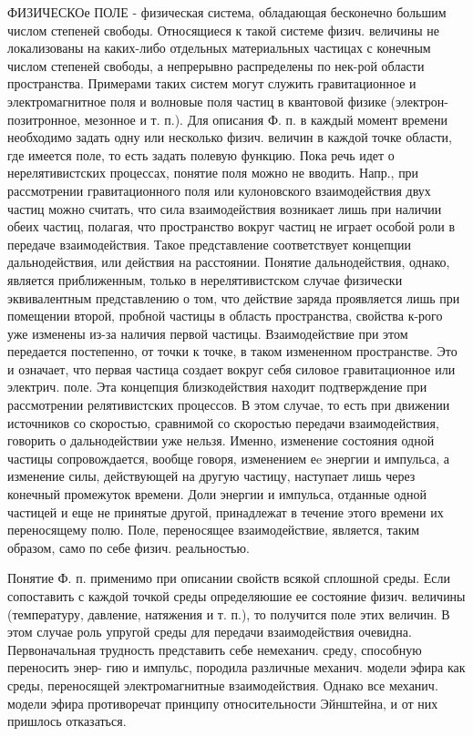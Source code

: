 \documentclass[10pt]{article}
\begin{document}
ФИЗИЧЕСКОе ПОЛЕ - физическая система, обладающая бесконечно большим числом степеней свободы. Относящиеся к такой системе физич. величины не локализованы на каких-либо отдельных материальных частицах с конечным числом степеней свободы, а непрерывно распределены по нек-рой области пространства. Примерами таких систем могут служить гравитационное и электромагнитное поля и волновые поля частиц в квантовой физике (электрон-позитронное, мезонное и т. п.). Для описания Ф. п. в каждый момент времени необходимо задать одну или несколько физич. величин в каждой точке области, где имеется поле, то есть задать полевую функцию. Пока речь идет о нерелятивистских процессах, понятие поля можно не вводить. Напр., при рассмотрении гравитационного поля или кулоновского взаимодействия двух частиц можно считать, что сила взаимодействия возникает лишь при наличии обеих частиц, полагая, что пространство вокруг частиц не играет особой роли в передаче взаимодействия. Такое представление соответствует концепции дальнодействия, или действия на расстоянии. Понятие дальнодействия, однако, является приближенным, только в нерелятивистском случае физически эквивалентным представлению о том, что действие заряда проявляется лишь при помещении второй, пробной частицы в область пространства, свойства к-рого уже изменены из-за наличия первой частицы. Взаимодействие при этом передается постепенно, от точки к точке, в таком измененном пространстве. Это и означает, что первая частица создает вокруг себя силовое гравитационное или электрич. поле. Эта концепция близкодействия находит подтверждение при рассмотрении релятивистских процессов. В этом случае, то есть при движении источников со скоростью, сравнимой со скоростью передачи взаимодействия, говорить о дальнодействии уже нельзя. Именно, изменение состояния одной частицы сопровождается, вообще говоря, изменением еe энергии и импульса, а изменение силы, действующей на другую частицу, наступает лишь через конечный промежуток времени. Доли энергии и импульса, отданные одной частицей и еще не принятые другой, принадлежат в течение этого времени их переносящему полю. Поле, переносящее взаимодействие, является, таким образом, само по себе физич. реальностью.



Понятие Ф. п. применимо при описании свойств всякой сплошной среды. Если сопоставить с каждой точкой среды определяюшие ее состояние физич. величины (температуру, давление, натяжения и т. п.), то получится поле этих величин. В этом случае роль упругой среды для передачи взаимодействия очевидна. Первоначальная трудность представить себе немеханич. среду, способную переносить энер- гию и импульс, породила различные механич. модели эфира как среды, переносящей электромагнитные взаимодействия. Однако все механич. модели эфира противоречат принципу относительности Эйнштейна, и от них пришлось отказаться.
\end{document}
